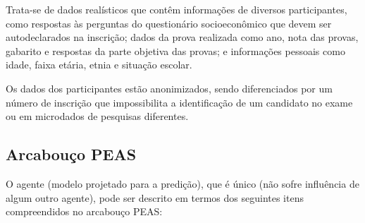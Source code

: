 \documentclass[letterpaper]{article} %
\begin{document}
Trata-se de dados realísticos que contêm informações de diversos participantes, como respostas às perguntas do questionário socioeconômico que devem ser autodeclarados na inscrição; dados da prova realizada como ano, nota das provas, gabarito e respostas da parte objetiva das provas; e informações pessoais como idade, faixa etária, etnia e situação escolar.

Os dados dos participantes estão anonimizados, sendo diferenciados por um número de inscrição que impossibilita a identificação de um candidato no exame ou em microdados de pesquisas diferentes.



\subsection{Arcabouço PEAS}

O agente (modelo projetado para a predição), que é único (não sofre influência de algum outro agente), pode ser descrito em termos dos seguintes itens compreendidos no arcabouço PEAS:
\end{document}
